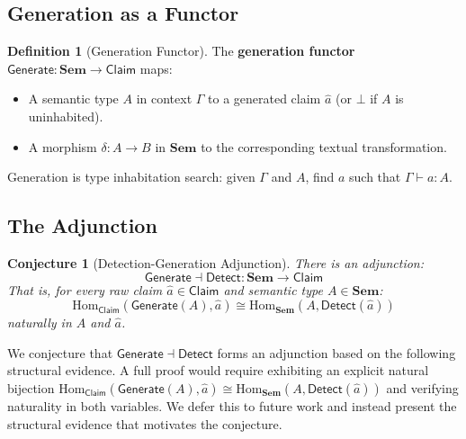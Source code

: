 \documentclass[11pt,a4paper]{article}
\theoremstyle{plain}
\newtheorem{conjecture}[theorem]{Conjecture}
\theoremstyle{definition}
\newtheorem{definition}[theorem]{Definition}
\theoremstyle{remark}
\newcommand{\Sem}{\mathbf{Sem}}
\newcommand{\Hom}{\mathrm{Hom}}
\newcommand{\Detect}{\mathsf{Detect}}
\newcommand{\Generate}{\mathsf{Generate}}
\begin{document}
\subsection{Generation as a Functor}

\begin{definition}[Generation Functor]\label{def:generate-functor}
The \textbf{generation functor} $\Generate\colon \Sem \to \mathsf{Claim}$ maps:
\begin{itemize}[nosep]
  \item A semantic type $A$ in context $\Gamma$ to a generated claim $\hat{a}$ (or $\bot$ if $A$ is uninhabited).
  \item A morphism $\delta : A \to B$ in $\Sem$ to the corresponding textual transformation.
\end{itemize}
Generation is type inhabitation search: given $\Gamma$ and $A$, find $a$ such that $\Gamma \vdash a : A$.
\end{definition}

\subsection{The Adjunction}

\begin{conjecture}[Detection-Generation Adjunction]\label{thm:adjunction}
There is an adjunction:
\[
\Generate \dashv \Detect \colon \Sem \to \mathsf{Claim}
\]
That is, for every raw claim $\hat{a} \in \mathsf{Claim}$ and semantic type $A \in \Sem$:
\[
\Hom_{\mathsf{Claim}}(\Generate(A), \hat{a}) \cong \Hom_{\Sem}(A, \Detect(\hat{a}))
\]
naturally in $A$ and $\hat{a}$.
\end{conjecture}

We conjecture that $\Generate \dashv \Detect$ forms an adjunction based on the following structural evidence. A full proof would require exhibiting an explicit natural bijection $\Hom_{\mathsf{Claim}}(\Generate(A), \hat{a}) \cong \Hom_{\Sem}(A, \Detect(\hat{a}))$ and verifying naturality in both variables. We defer this to future work and instead present the structural evidence that motivates the conjecture.
\end{document}
